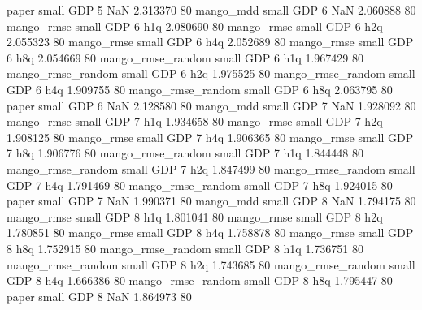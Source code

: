             paper      small      GDP                 5                  NaN 2.313370 80
        mango_mdd      small      GDP                 6                  NaN 2.060888 80
       mango_rmse      small      GDP                 6                  h1q 2.080690 80
       mango_rmse      small      GDP                 6                  h2q 2.055323 80
       mango_rmse      small      GDP                 6                  h4q 2.052689 80
       mango_rmse      small      GDP                 6                  h8q 2.054669 80
mango_rmse_random      small      GDP                 6                  h1q 1.967429 80
mango_rmse_random      small      GDP                 6                  h2q 1.975525 80
mango_rmse_random      small      GDP                 6                  h4q 1.909755 80
mango_rmse_random      small      GDP                 6                  h8q 2.063795 80
            paper      small      GDP                 6                  NaN 2.128580 80
        mango_mdd      small      GDP                 7                  NaN 1.928092 80
       mango_rmse      small      GDP                 7                  h1q 1.934658 80
       mango_rmse      small      GDP                 7                  h2q 1.908125 80
       mango_rmse      small      GDP                 7                  h4q 1.906365 80
       mango_rmse      small      GDP                 7                  h8q 1.906776 80
mango_rmse_random      small      GDP                 7                  h1q 1.844448 80
mango_rmse_random      small      GDP                 7                  h2q 1.847499 80
mango_rmse_random      small      GDP                 7                  h4q 1.791469 80
mango_rmse_random      small      GDP                 7                  h8q 1.924015 80
            paper      small      GDP                 7                  NaN 1.990371 80
        mango_mdd      small      GDP                 8                  NaN 1.794175 80
       mango_rmse      small      GDP                 8                  h1q 1.801041 80
       mango_rmse      small      GDP                 8                  h2q 1.780851 80
       mango_rmse      small      GDP                 8                  h4q 1.758878 80
       mango_rmse      small      GDP                 8                  h8q 1.752915 80
mango_rmse_random      small      GDP                 8                  h1q 1.736751 80
mango_rmse_random      small      GDP                 8                  h2q 1.743685 80
mango_rmse_random      small      GDP                 8                  h4q 1.666386 80
mango_rmse_random      small      GDP                 8                  h8q 1.795447 80
            paper      small      GDP                 8                  NaN 1.864973 80